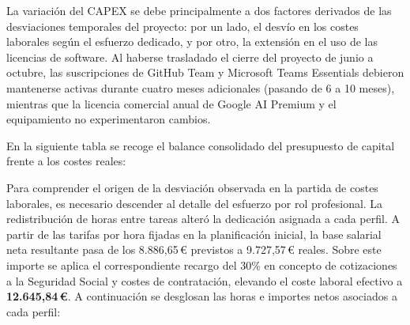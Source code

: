 La variación del CAPEX se debe principalmente a dos factores derivados de las desviaciones temporales del proyecto: por un lado, el desvío en los costes laborales según el esfuerzo dedicado, y por otro, la extensión en el uso de las licencias de software. Al haberse trasladado el cierre del proyecto de junio a octubre, las suscripciones de GitHub Team y Microsoft Teams Essentials debieron mantenerse activas durante cuatro meses adicionales (pasando de 6 a 10 meses), mientras que la licencia comercial anual de Google AI Premium y el equipamiento no experimentaron cambios.

En la siguiente tabla se recoge el balance consolidado del presupuesto de capital frente a los costes reales:

\begin{table}[H]
  \centering
  \small
  \renewcommand{\arraystretch}{1.24}
  \caption{Comparativa de CAPEX presupuestado vs. real.}
  \label{tab:resumen_capex_real}
\end{table}

Para comprender el origen de la desviación observada en la partida de costes laborales, es necesario descender al detalle del esfuerzo por rol profesional. La redistribución de horas entre tareas alteró la dedicación asignada a cada perfil. A partir de las tarifas por hora fijadas en la planificación inicial, la base salarial neta resultante pasa de los 8.886,65\,\euro{} previstos a 9.727,57\,\euro{} reales. Sobre este importe se aplica el correspondiente recargo del 30\% en concepto de cotizaciones a la Seguridad Social y costes de contratación, elevando el coste laboral efectivo a \textbf{12.645,84\,\euro{}}. A continuación se desglosan las horas e importes netos asociados a cada perfil:

